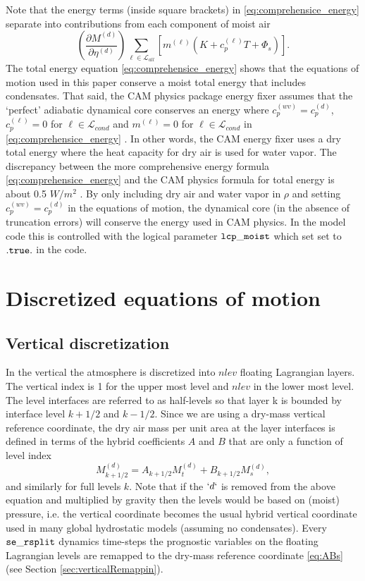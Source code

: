 \documentclass{agujournal}
\begin{document}
{Note that the energy terms (inside square brackets) in \eqref{eq:comprehensice_energy} separate into contributions from each component of moist air
\begin{equation}
\left( \frac{\partial M^{(d)}}{\partial \eta^{(d)}} \right)\sum_{\ell \in \mathcal{L}_{all}} \left[ m^{(\ell)}\left(K+c_p^{(\ell)}T+\Phi_s\right)\right].
\end{equation}
The total energy equation \eqref{eq:comprehensice_energy} shows that the equations of motion used in this paper conserve a moist total energy that includes condensates. That said, the CAM physics package energy fixer assumes that the `perfect' adiabatic dynamical core conserves an energy where $c_p^{(wv)}= c_p^{(d)}$, $c_p^{(\ell)}=0$ for $\ell\in \mathcal{L}_{cond}$ and $m^{(\ell)}=0$ for $\ell\in \mathcal{L}_{cond}$ in \eqref{eq:comprehensice_energy} \citep{WOHTTV2015JAMES}. In other words, the CAM energy fixer uses a dry total energy where the heat capacity for dry air is used for water vapor. The discrepancy between the more comprehensive energy formula \eqref{eq:comprehensice_energy} and the CAM physics formula for total energy is about 0.5 $W/m^2$ \citep{T2011LNCSEb}. By only including dry air and water vapor   in $\rho$ and setting $c_p^{(wv)}= c_p^{(d)}$ in the equations of motion, the dynamical core (in the absence of truncation errors) will conserve the energy used in CAM physics. In the model code this is controlled with the logical parameter $\tt{lcp\_moist}$ which set set to $\tt{.true.}$ in the code.


\section{Discretized equations of motion}\label{sec:discretized_eqs}
\subsection{Vertical discretization}
In the vertical the atmosphere is discretized into $nlev$ floating Lagrangian layers. The vertical index is 1 for the upper most level and $nlev$ in the lower most level. The level interfaces are referred to as half-levels so that layer k is bounded by interface level $k+1/2$ and $k-1/2$. Since we are using a dry-mass vertical reference coordinate, the dry air mass per unit area at the layer interfaces is defined in terms of the hybrid coefficients $A$ and $B$
 that are only a function of level index
\begin{equation}
M^{(d)}_{k+1/2}=A_{k+1/2}M^{(d)}_t+B_{k+1/2}M_s^{(d)},\label{eq:ABs}
\end{equation}
and similarly for full levels $k$. Note that if the $`d`$ is removed from the above equation and multiplied by gravity then the levels would be based on (moist) pressure, i.e. the vertical coordinate becomes the usual hybrid vertical coordinate used in many global hydrostatic models (assuming no condensates). Every ${\tt{se\_rsplit}}$ dynamics time-steps the prognostic variables on the floating Lagrangian levels are remapped to the dry-mass reference coordinate \eqref{eq:ABs} (see Section \ref{sec:verticalRemappin}). 

}
\end{document}
